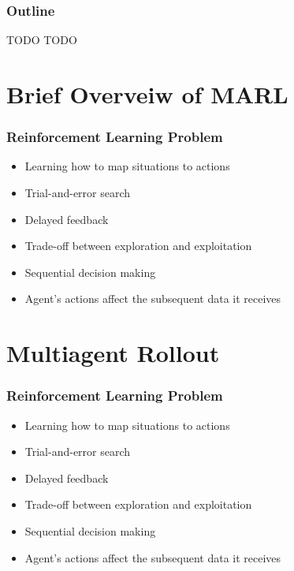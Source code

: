 \documentclass{beamer}
\begin{document}
\begin{frame}
	\frametitle{Outline}
	\begin{block}{TODO}
		TODO
	\end{block}

\end{frame}








\section{Brief Overveiw of MARL}



\begin{frame}
\frametitle{Reinforcement Learning Problem}
\begin{itemize}
	\item Learning how to map situations to actions 
	\item Trial-and-error search
	\item Delayed feedback
	\item Trade-off between exploration and exploitation
	\item Sequential decision making
	\item Agent's actions affect the subsequent data it receives
\end{itemize}
\end{frame}



\section{Multiagent Rollout}

\begin{frame}
	\frametitle{Reinforcement Learning Problem}
	\begin{itemize}
		\item Learning how to map situations to actions 
		\item Trial-and-error search
		\item Delayed feedback
		\item Trade-off between exploration and exploitation
		\item Sequential decision making
		\item Agent's actions affect the subsequent data it receives
	\end{itemize}
\end{frame}
\end{document}
